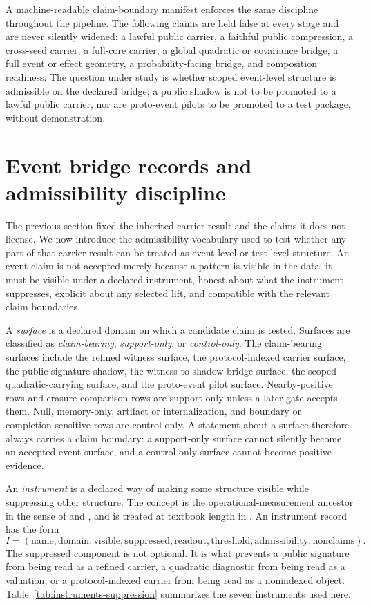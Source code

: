 \documentclass[11pt]{article}
\theoremstyle{definition}
\begin{document}
A machine-readable claim-boundary manifest enforces the same discipline throughout the pipeline. The following claims are held false at every stage and are never silently widened: a lawful public carrier, a faithful public compression, a cross-seed carrier, a full-core carrier, a global quadratic or covariance bridge, a full event or effect geometry, a probability-facing bridge, and composition readiness. The question under study is whether scoped event-level structure is admissible on the declared bridge; a public shadow is not to be promoted to a lawful public carrier, nor are proto-event pilots to be promoted to a test package, without demonstration.
 \section{Event bridge records and admissibility discipline}
\label{sec:bridge-records}

The previous section fixed the inherited carrier result and the claims it does not license. We now introduce the admissibility vocabulary used to test whether any part of that carrier result can be treated as event-level or test-level structure. An event claim is not accepted merely because a pattern is visible in the data; it must be visible under a declared instrument, honest about what the instrument suppresses, explicit about any selected lift, and compatible with the relevant claim boundaries.

A \emph{surface} is a declared domain on which a candidate claim is tested. Surfaces are classified as \emph{claim-bearing}, \emph{support-only}, or \emph{control-only}. The claim-bearing surfaces include the refined witness surface, the protocol-indexed carrier surface, the public signature shadow, the witness-to-shadow bridge surface, the scoped quadratic-carrying surface, and the proto-event pilot surface. Nearby-positive rows and erasure comparison rows are support-only unless a later gate accepts them. Null, memory-only, artifact or internalization, and boundary or completion-sensitive rows are control-only. A statement about a surface therefore always carries a claim boundary: a support-only surface cannot silently become an accepted event surface, and a control-only surface cannot become positive evidence.

An \emph{instrument} is a declared way of making some structure visible while suppressing other structure. The concept is the operational-measurement ancestor in the sense of \citet{DaviesLewis1970} and \citet{Kraus1983}, and is treated at textbook length in \citet{BuschLahti2016}. An instrument record has the form
\[
  I=(\mathrm{name},\mathrm{domain},\mathrm{visible},\mathrm{suppressed},
      \mathrm{readout},\mathrm{threshold},\mathrm{admissibility},\mathrm{nonclaims}).
\]
The suppressed component is not optional. It is what prevents a public signature from being read as a refined carrier, a quadratic diagnostic from being read as a valuation, or a protocol-indexed carrier from being read as a nonindexed object. Table~\ref{tab:instruments-suppression} summarizes the seven instruments used here.
\end{document}
